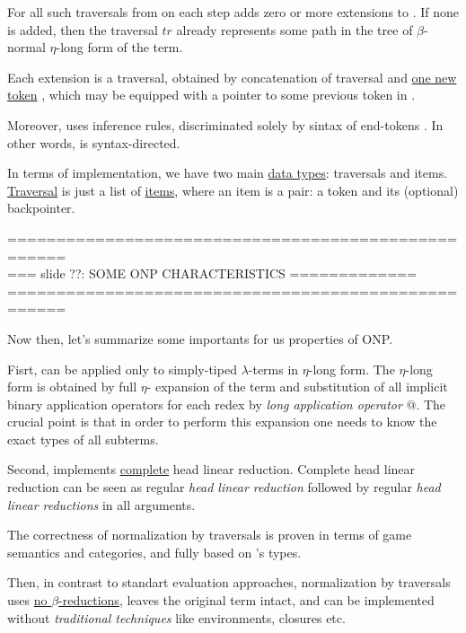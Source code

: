\documentclass[a4paper, 10pt]{article} %
\newcommand{\red}[1]{{\color{red}#1}}
\newcommand{\green}[1]{{\color{blue!20!black!30!green}#1}}
\newcommand{\blue}[1]{{\color{blue}#1}}
\newcommand{\lam}[1]{{\color{brown}\emph{\boldmath{#1}}}}
\begin{document}
For all such traversals from \lam{$\mathfrak{Trav}(M)$} \lam{ONP} on
each step adds zero or more extensions to \lam{$\mathfrak{Trav}(M)$}. 
If none is added, then the traversal $tr$ already represents some path in
the tree of $\beta$-normal $\eta$-long form of the term.

Each extension is a traversal, obtained by concatenation of traversal
\lam{$tr$} and \underline{one new token} \lam{$t'$}, which may be
equipped with a pointer to some previous token in \lam{$tr$}.

Moreover, \lam{ONP} uses inference rules, discriminated solely by sintax
of end-tokens \lam{$t_n$}. In other words, \lam{ONP} is \blue{syntax-directed}.

In terms of implementation, we have two main \underline{data types}:
traversals and items. \underline{Traversal} is just a list of
\underline{items}, where an item is a pair: a token and its (optional) 
backpointer.

====================================================\\
=== slide ??: SOME ONP CHARACTERISTICS =============\\
====================================================

Now then, let's summarize some importants for us properties of \green{ONP}.

Fisrt, \lam{ONP} can be applied only to \blue{simply-tiped} $\lambda$-terms
in \blue{$\eta$-long form}. The $\eta$-long form is obtained by full $\eta$-
expansion of the term and substitution of all implicit binary application operators 
for each redex by \emph{long application operator} $@$. The crucial
point is that in order to perform this expansion one needs to know the exact 
types of all subterms.

Second, \lam{ONP} implements \green{\underline{complete} head linear
reduction}. Complete head linear reduction can be seen as regular
\emph{head linear reduction} followed by regular \emph{head linear 
reductions} in all arguments.

The correctness of normalization by traversals is proven in terms of game 
semantics and categories, and fully based on \lam{$M$}'s types.

Then, in contrast to standart evaluation approaches, normalization by 
traversals uses \red{\underline{no $\beta$-reductions}}, leaves the original 
term intact, and can be implemented without \emph{traditional 
techniques} like environments, closures etc.
\end{document}
